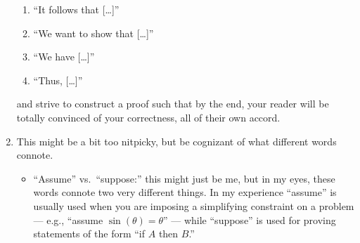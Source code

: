 \documentclass{fkpset}
\begin{document}
\begin{problem}[A9]
\begin{enumerate}
\begin{enumerate}[label=\roman*)]
        \item ``It follows that [\ldots]''\vspace{.5em}
        \item ``We {\color{blue} want to} show that [\ldots]''\vspace{.5em}
        \item ``We {\color{blue} have} [\ldots]''\vspace{.5em}
        \item ``Thus, [\ldots]''\vspace{.5em}
      \end{enumerate}
      and strive to construct a proof such that by the end, your reader will be
      totally convinced of your correctness, all of their own accord.
    \item This might be a bit too nitpicky, but be cognizant of what different
      words connote.
      \begin{itemize}
        \item ``Assume'' vs.\ ``suppose:'' this might just be me, but in my
          eyes, these words connote two very different things. In my experience
          ``assume'' is usually used when you are imposing a simplifying
          constraint on a problem --- e.g., ``assume $\sin(\theta) = \theta$''
          --- while ``suppose'' is used for proving statements of the form ``if
          $A$ then $B$.''\\


\end{itemize}
\end{enumerate}
\end{problem}
\end{document}

